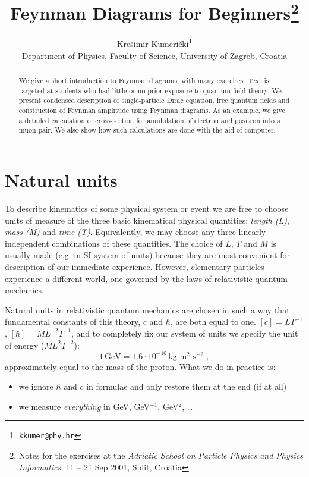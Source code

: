 \documentclass[a4paper,12pt]{article}
\theoremstyle{break}
\theoremstyle{plain}
\begin{document}

\title{ \Huge {Feynman Diagrams for Beginners}\footnote{%
Notes for the exercises at the
\emph{Adriatic School on Particle Physics and Physics Informatics},
11 -- 21 Sep 2001, Split, Croatia}
}

\author{{Krešimir Kumerički}\footnote{\scriptsize\texttt{kkumer@phy.hr}}\\[2ex]
\small Department of Physics, Faculty of Science, University of Zagreb, Croatia}
\date{}
\maketitle

\begin{abstract}                              
  We give a short introduction to Feynman diagrams, with many exercises.
  Text is targeted at students who had little or no prior exposure to
  quantum field theory. We present condensed description of single-particle 
  Dirac equation,
  free quantum fields and construction of Feynman amplitude using
  Feynman diagrams. As an example, we give a detailed calculation of
  cross-section for annihilation of electron and positron into a muon pair.
  We also show how such calculations are done with the aid of computer.
\end{abstract}      

\tableofcontents

\section{Natural units}

To describe kinematics of some physical system or event we are free to choose
units of measure of the three basic kinematical physical
quantities: \emph{length} \emph{(L)}, \emph{mass} \emph{(M)} and
\emph{time} \emph{(T)}. Equivalently, we may choose any three linearly
independent combinations of these quantities.
The choice of $L$, $T$ and $M$ is usually made (e.g. in SI system of
units) because they are most convenient for description of our immediate
experience. However, elementary particles experience a different world,
one governed by the laws of relativistic quantum mechanics.

Natural units in relativistic quantum mechanics are chosen in such a
way that
fundamental constants of this theory, $c$ and $\hbar$, are both equal to one.
$[c]=LT^{-1}$, $[\hbar]=ML^{-2}T^{-1}$, and to completely fix our system
of units we specify the unit of energy ($ML^2T^{-2}$):
\[
  1\,\mbox{GeV} = 1.6\cdot 10^{-10}\,\mbox{kg m$^2$ s$^{-2}$} \;,
\]
approximately equal to the mass of the proton.
What we do in practice is:
\begin{itemize}
\item we ignore $\hbar$ and $c$ in  formulae and only restore them at the
  end (if at all)
\item we measure \emph{everything} in GeV, GeV$^{-1}$, GeV$^2$, \ldots
\end{itemize}
\end{document}
